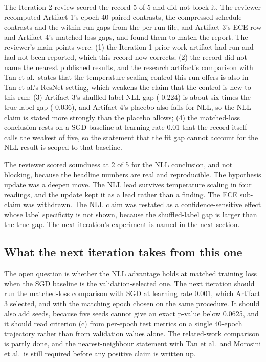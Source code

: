 \documentclass[11pt,letterpaper]{article}
\begin{document}
The Iteration 2 review scored the record 5 of 5 and did not block it. The reviewer recomputed Artifact 1's epoch-40 paired contrasts, the compressed-schedule contrasts and the within-run gaps from the per-run file, and Artifact 3's ECE row and Artifact 4's matched-loss gaps, and found them to match the report. The reviewer's main points were: (1) the Iteration 1 prior-work artifact had run and had not been reported, which this record now corrects; (2) the record did not name the nearest published results, and the research artifact's comparison with Tan et al.\ states that the temperature-scaling control this run offers is also in Tan et al.'s ResNet setting, which weakens the claim that the control is new to this run; (3) Artifact 3's shuffled-label NLL gap (-0.224) is about six times the true-label gap (-0.036), and Artifact 4's placebo also fails for NLL, so the NLL claim is stated more strongly than the placebo allows; (4) the matched-loss conclusion rests on a SGD baseline at learning rate 0.01 that the record itself calls the weakest of five, so the statement that the fit gap cannot account for the NLL result is scoped to that baseline.

The reviewer scored soundness at 2 of 5 for the NLL conclusion, and not blocking, because the headline numbers are real and reproducible. The hypothesis update was a deepen move. The NLL lead survives temperature scaling in four readings, and the update kept it as a lead rather than a finding. The ECE sub-claim was withdrawn. The NLL claim was restated as a confidence-sensitive effect whose label specificity is not shown, because the shuffled-label gap is larger than the true gap. The next iteration's experiment is named in the next section.

\subsection{What the next iteration takes from this one}

The open question is whether the NLL advantage holds at matched training loss when the SGD baseline is the validation-selected one. The next iteration should run the matched-loss comparison with SGD at learning rate 0.001, which Artifact 3 selected, and with the matching epoch chosen on the same procedure. It should also add seeds, because five seeds cannot give an exact p-value below 0.0625, and it should read criterion (c) from per-epoch test metrics on a single 40-epoch trajectory rather than from validation values alone. The related-work comparison is partly done, and the nearest-neighbour statement with Tan et al.\ and Morosini et al.\ is still required before any positive claim is written up.
\end{document}
